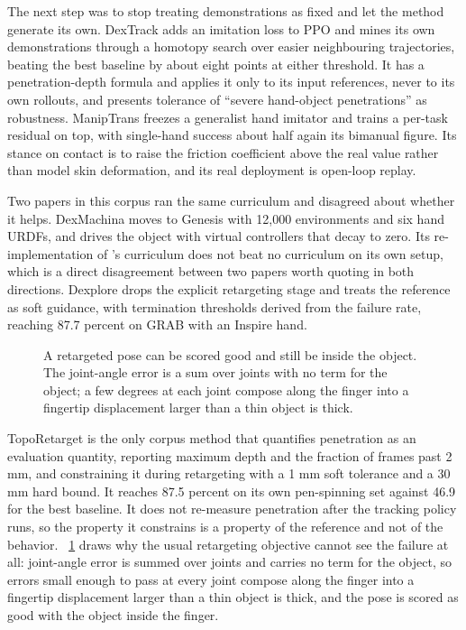 The next step was to stop treating demonstrations as fixed and let the method generate its own.
DexTrack \cite{dextrack_2025} adds an imitation loss to PPO and mines its own demonstrations
through a homotopy search over easier neighbouring trajectories, beating the best baseline by about
eight points at either threshold. It has a penetration-depth formula and applies it only to its
input references, never to its own rollouts, and presents tolerance of ``severe hand-object
penetrations'' as robustness. ManipTrans \cite{maniptrans_2025} freezes a generalist hand imitator
and trains a per-task residual on top, with single-hand success about half again its bimanual
figure. Its stance on contact is to raise the friction coefficient above the real value rather than
model skin deformation, and its real deployment is open-loop replay.

Two papers in this corpus ran the same curriculum and disagreed about whether it helps.
DexMachina \cite{dexmachina_2025} moves to Genesis with 12,000 environments and six hand URDFs,
and drives the object with virtual controllers that decay to zero. Its re-implementation of
\cite{maniptrans_2025}'s curriculum does not beat no curriculum on its own setup, which is a
direct disagreement between two papers worth quoting in both directions. Dexplore
\cite{dexplore_2025} drops the explicit retargeting stage and treats the reference as soft
guidance, with termination thresholds derived from the failure rate, reaching 87.7 percent on
GRAB with an Inspire hand.

\begin{figure}[!t]
  \centering
  \caption{A retargeted pose can be scored good and still be inside the object. The joint-angle
  error is a sum over joints with no term for the object; a few degrees at each joint compose
  along the finger into a fingertip displacement larger than a thin object is thick.}
  \label{fig:retarget}
\end{figure}

TopoRetarget \cite{toporetarget_2026} is the only corpus method that quantifies penetration as an
evaluation quantity, reporting maximum depth and the fraction of frames past 2 mm, and
constraining it during retargeting with a 1 mm soft tolerance and a 30 mm hard bound. It reaches
87.5 percent on its own pen-spinning set against 46.9 for the best baseline. It does not
re-measure penetration after the tracking policy runs, so the property it constrains is a property
of the reference and not of the behavior. \figurename~\ref{fig:retarget} draws why the usual
retargeting objective cannot see the failure at all: joint-angle error is summed over joints and
carries no term for the object, so errors small enough to pass at every joint compose along the
finger into a fingertip displacement larger than a thin object is thick, and the pose is scored as
good with the object inside the finger.

